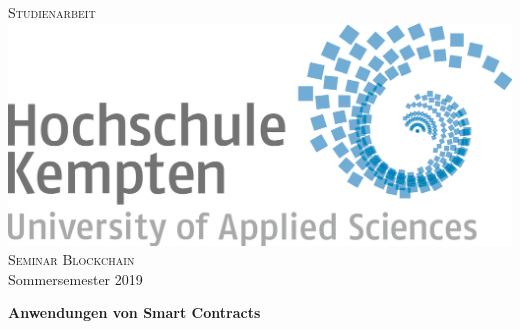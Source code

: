 \documentclass[
  fontsize=12pt, %
  a4paper,  %
  oneside,  %
  bibliography=totoc,
  headsepline,
  cleardoublepage=empty,
  parskip=half,
  draft=false
]{scrbook}
\begin{document}
\begin{titlepage}

\newcommand{\HRule}{\rule{\linewidth}{0.5mm}} %

\center %
 

\textsc{\LARGE Studienarbeit}\\[1.5cm] %
\includegraphics[scale=.15]{logos/Logo_Hochschule_Kempten.png}\\[1cm] %
\textsc{\Large Seminar Blockchain }\\[0.5cm] %
{\Large Sommersemester 2019} %

\vspace{2.5cm}
{ \huge \bfseries Anwendungen von Smart Contracts }%
\vspace{2.5cm}
 

\end{titlepage}
\end{document}
